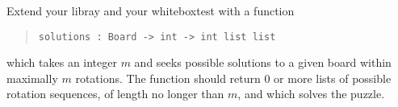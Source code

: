 Extend your libray and your whiteboxtest with a function
\begin{quote}
  \lstinline{solutions : Board -> int -> int list list}
\end{quote}
which takes an integer $m$ and seeks possible solutions to a given board within maximally $m$ rotations. The function should return 0 or more lists of possible rotation sequences, of length no longer than $m$, and which solves the puzzle.
